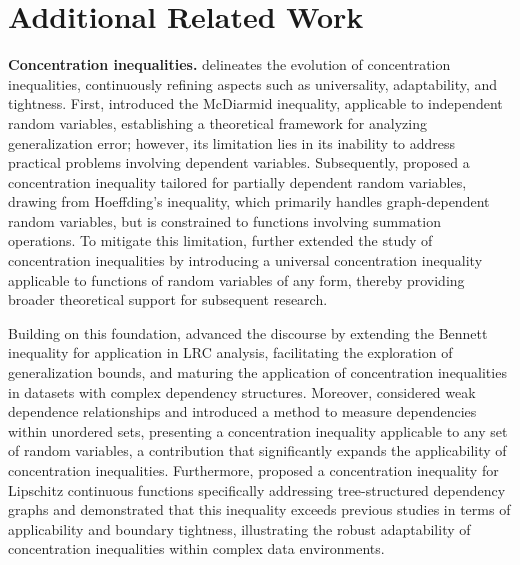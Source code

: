 \documentclass{article}
\begin{document}
\section{Additional Related Work}  \label{section: D}
\textbf{Concentration inequalities.} \cite{zhang2022generalization} delineates the evolution of concentration inequalities, continuously refining aspects such as universality, adaptability, and tightness. First, \cite{Mcolin89} introduced the McDiarmid inequality, applicable to independent random variables, establishing a theoretical framework for analyzing generalization error; however, its limitation lies in its inability to address practical problems involving dependent variables. Subsequently, \cite{jason04} proposed a concentration inequality tailored for partially dependent random variables, drawing from Hoeffding's inequality, which primarily handles graph-dependent random variables, but is constrained to functions involving summation operations. To mitigate this limitation, \cite{usunier2005generalization} further extended the study of concentration inequalities by introducing a universal concentration inequality applicable to functions of random variables of any form, thereby providing broader theoretical support for subsequent research.

Building on this foundation, \cite{ralaivola2015entropy} advanced the discourse by extending the Bennett inequality for application in LRC analysis, facilitating the exploration of generalization bounds, and maturing the application of concentration inequalities in datasets with complex dependency structures. Moreover, \cite{lampert18} considered weak dependence relationships and introduced a method to measure dependencies within unordered sets, presenting a concentration inequality applicable to any set of random variables, a contribution that significantly expands the applicability of concentration inequalities. Furthermore, \cite{zhang19mcdiarmid} proposed a concentration inequality for Lipschitz continuous functions specifically addressing tree-structured dependency graphs and demonstrated that this inequality exceeds previous studies in terms of applicability and boundary tightness, illustrating the robust adaptability of concentration inequalities within complex data environments.
\end{document}
